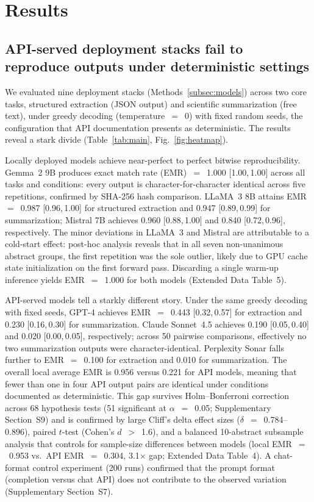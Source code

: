 \documentclass[sn-nature]{sn-jnl}
\begin{document}
\section{Results}\label{sec:results}

\subsection{API-served deployment stacks fail to reproduce outputs under deterministic settings}\label{subsec:greedy}

We evaluated nine deployment stacks (Methods~\ref{subsec:models}) across two core tasks, structured extraction (JSON output) and scientific summarization (free text), under greedy decoding (temperature~$=$~0) with fixed random seeds, the configuration that API documentation presents as deterministic.
The results reveal a stark divide (Table~\ref{tab:main}, Fig.~\ref{fig:heatmap}).

Locally deployed models achieve near-perfect to perfect bitwise reproducibility.
Gemma~2 9B produces exact match rate (EMR)~$=$~1.000 [1.00,\,1.00] across all tasks and conditions: every output is character-for-character identical across five repetitions, confirmed by SHA-256 hash comparison.
LLaMA~3 8B attains EMR~$=$~0.987 [0.96,\,1.00] for structured extraction and 0.947 [0.89,\,0.99] for summarization; Mistral 7B achieves 0.960 [0.88,\,1.00] and 0.840 [0.72,\,0.96], respectively.
The minor deviations in LLaMA~3 and Mistral are attributable to a cold-start effect: post-hoc analysis reveals that in all seven non-unanimous abstract groups, the first repetition was the sole outlier, likely due to GPU cache state initialization on the first forward pass.
Discarding a single warm-up inference yields EMR~$=$~1.000 for both models (Extended Data Table~5).

API-served models tell a starkly different story.
Under the same greedy decoding with fixed seeds, GPT-4 achieves EMR~$=$~0.443 [0.32,\,0.57] for extraction and 0.230 [0.16,\,0.30] for summarization.
Claude Sonnet~4.5 achieves 0.190 [0.05,\,0.40] and 0.020 [0.00,\,0.05], respectively; across 50 pairwise comparisons, effectively no two summarization outputs were character-identical.
Perplexity Sonar falls further to EMR~$=$~0.100 for extraction and 0.010 for summarization.
The overall local average EMR is 0.956 versus 0.221 for API models, meaning that fewer than one in four API output pairs are identical under conditions documented as deterministic.
This gap survives Holm--Bonferroni correction across 68 hypothesis tests (51 significant at $\alpha$~$=$~0.05; Supplementary Section~S9) and is confirmed by large Cliff's delta effect sizes ($\delta$~$=$~0.784--0.896), paired $t$-test (Cohen's $d$~$>$~1.6), and a balanced 10-abstract subsample analysis that controls for sample-size differences between models (local EMR~$=$~0.953 vs.\ API EMR~$=$~0.304, 3.1$\times$ gap; Extended Data Table~4).
A chat-format control experiment (200 runs) confirmed that the prompt format (completion versus chat API) does not contribute to the observed variation (Supplementary Section~S7).
\end{document}
